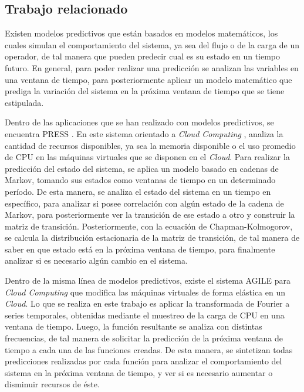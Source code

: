 \subsection{Trabajo relacionado}
\label{subSec:markovTrabajo}
Existen modelos predictivos que están basados en modelos matemáticos, los cuales simulan el comportamiento del sistema, ya sea del flujo o de la carga de un operador, de tal manera que pueden predecir cual es su estado en un tiempo futuro. En general, para poder realizar una predicción se analizan las variables en una ventana de tiempo, para posteriormente aplicar un modelo matemático que prediga la variación del sistema en la próxima ventana de tiempo que se tiene estipulada.

Dentro de las aplicaciones que se han realizado con modelos predictivos, se encuentra PRESS \citep{GongGW10}. En este sistema orientado a \textit{Cloud Computing} \citep{bookDistrSys}, analiza la cantidad de recursos disponibles, ya sea la memoria disponible o el uso promedio de CPU en las máquinas virtuales que se disponen en el \textit{Cloud}. Para realizar la predicción del estado del sistema, se aplica un modelo basado en cadenas de Markov, tomando sus estados como ventanas de tiempo en un determinado período. De esta manera, se analiza el estado del sistema en un tiempo en específico, para analizar si posee correlación con algún estado de la cadena de Markov, para posteriormente ver la transición de ese estado a otro y construir la matriz de transición. Posteriormente, con la ecuación de Chapman-Kolmogorov, se calcula la distribución estacionaria de la matriz de transición, de tal manera de saber en que estado está en la próxima ventana de tiempo, para finalmente analizar si es necesario algún cambio en el sistema.

Dentro de la misma línea de modelos predictivos, existe el sistema AGILE \citep{NguyenSGSW13} para \textit{Cloud Computing} que modifica las máquinas virtuales de forma elástica en un \textit{Cloud}. Lo que se realiza en este trabajo es aplicar la transformada de Fourier \citep{falk2012first} a series temporales, obtenidas mediante el muestreo de la carga de CPU en una ventana de tiempo. Luego, la función resultante se analiza con distintas frecuencias, de tal manera de solicitar la predicción de la próxima ventana de tiempo a cada una de las funciones creadas. De esta manera, se sintetizan todas predicciones realizadas por cada función para analizar el comportamiento del sistema en la próxima ventana de tiempo, y ver si es necesario aumentar o disminuir recursos de éste.

